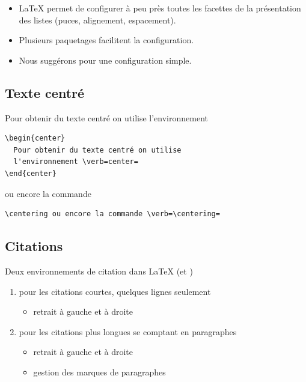 \begin{conseil}
  \begin{itemize}
  \item {\LaTeX} permet de configurer à peu près toutes les facettes
    de la présentation des listes (puces, alignement, espacement).
  \item Plusieurs paquetages facilitent la configuration.
  \item Nous suggérons  pour une configuration simple.
  \end{itemize}
\end{conseil}

\subsection{Texte centré}

\begin{center}
  Pour obtenir du texte centré on utilise l'environnement
\end{center}

\begin{lstlisting}
\begin{center}
  Pour obtenir du texte centré on utilise
  l'environnement \verb=center=
\end{center}
\end{lstlisting}

{\centering ou encore la commande \cmd{\centering}}

\begin{lstlisting}
\centering ou encore la commande \verb=\centering=
\end{lstlisting}

\subsection{Citations}

Deux environnements de citation dans {\LaTeX} (et )
\begin{enumerate}
\item {} pour les citations courtes, quelques lignes seulement
  \begin{itemize}
  \item retrait à gauche et à droite
  \end{itemize}
\item {} pour les citations plus longues se comptant
  en paragraphes
  \begin{itemize}
  \item retrait à gauche et à droite
  \item gestion des marques de paragraphes
  \end{itemize}
\end{enumerate}

